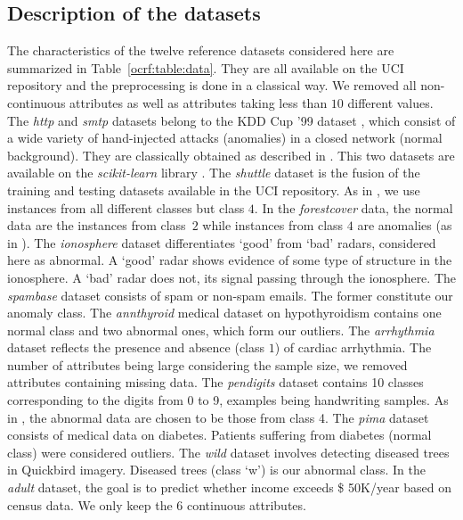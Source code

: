 \subsection{Description of the datasets}
%
The characteristics of the twelve reference datasets considered here are summarized
in Table~\ref{ocrf:table:data}. They are all available on the UCI repository
\citep{Lichman2013} and the preprocessing is done in a classical way. %
We removed all non-continuous attributes as well as attributes taking less than $10$ different values.
%
The \emph{http} and \emph{smtp} datasets belong to the KDD Cup '99 dataset \citep{KDD99, Tavallaee2009}, which consist of a wide variety of hand-injected  attacks (anomalies) in a closed network (normal background). They are classically obtained as described in \cite{Yamanishi2000}. This two datasets are available on the \emph{scikit-learn} library \citep{sklearn2011}.
The \emph{shuttle} dataset is the fusion of the training and testing datasets available in the UCI repository. As in \cite{Liu2008}, we use instances from all different classes but class $4$.%
In the \emph{forestcover} data, the normal data are the instances from class~$2$ while instances from class $4$ are anomalies (as in \cite{Liu2008}). %
The \emph{ionosphere} dataset differentiates `good' from `bad' radars, considered here as abnormal. A `good' radar shows evidence of some type of structure in the ionosphere. A `bad' radar does not, its signal passing through the ionosphere.
The \emph{spambase} dataset consists of spam or non-spam emails. The former constitute our anomaly class.
The \emph{annthyroid} medical dataset on hypothyroidism contains one normal class and two abnormal ones, which form our outliers.
The \emph{arrhythmia} dataset reflects the presence and absence (class $1$) of cardiac arrhythmia. The number of attributes being large considering the sample size, we removed attributes containing missing data.
The \emph{pendigits} dataset contains 10 classes corresponding to the digits from 0 to 9, examples being handwriting samples. As in \cite{Schubert2012}, the abnormal data are chosen to be those from class 4.
The \emph{pima} dataset consists of medical data on diabetes. Patients suffering from diabetes (normal class) were considered outliers.
The \emph{wild} dataset involves detecting diseased trees in Quickbird imagery. Diseased trees (class `w') is our abnormal class.
In the \emph{adult} dataset, the goal is to predict whether income exceeds \$ 50K/year based on census data. We only keep the 6 continuous attributes.

